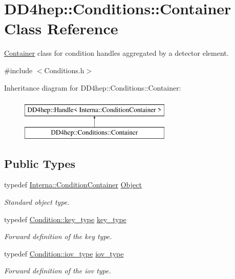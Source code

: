 \hypertarget{class_d_d4hep_1_1_conditions_1_1_container}{}\section{D\+D4hep\+:\+:Conditions\+:\+:Container Class Reference}
\label{class_d_d4hep_1_1_conditions_1_1_container}


\hyperlink{class_d_d4hep_1_1_conditions_1_1_container}{Container} class for condition handles aggregated by a detector element.  




{\ttfamily \#include $<$Conditions.\+h$>$}

Inheritance diagram for D\+D4hep\+:\+:Conditions\+:\+:Container\+:\begin{figure}[H]
\begin{center}
\leavevmode
\includegraphics[height=2.000000cm]{class_d_d4hep_1_1_conditions_1_1_container}
\end{center}
\end{figure}
\subsection*{Public Types}
\begin{DoxyCompactItemize}
\item 
typedef \hyperlink{class_d_d4hep_1_1_conditions_1_1_interna_1_1_condition_container}{Interna\+::\+Condition\+Container} \hyperlink{class_d_d4hep_1_1_conditions_1_1_container_a45d612d4b81c549a40ca21e3318d3ddb}{Object}
\begin{DoxyCompactList}\small\item\em Standard object type. \end{DoxyCompactList}\item 
typedef \hyperlink{class_d_d4hep_1_1_conditions_1_1_condition_a7528efa762e8cc072ef80ea67c3531f9}{Condition\+::key\+\_\+type} \hyperlink{class_d_d4hep_1_1_conditions_1_1_container_a65e62d9e4a43b9b0e9e46a7b80876a21}{key\+\_\+type}
\begin{DoxyCompactList}\small\item\em Forward definition of the key type. \end{DoxyCompactList}\item 
typedef \hyperlink{class_d_d4hep_1_1_conditions_1_1_condition_ad84300e226b2085ec5e9db7f47be5539}{Condition\+::iov\+\_\+type} \hyperlink{class_d_d4hep_1_1_conditions_1_1_container_a169b09fd183c9e05faf63429bad6c668}{iov\+\_\+type}
\begin{DoxyCompactList}\small\item\em Forward definition of the iov type. \end{DoxyCompactList}\end{DoxyCompactItemize}

